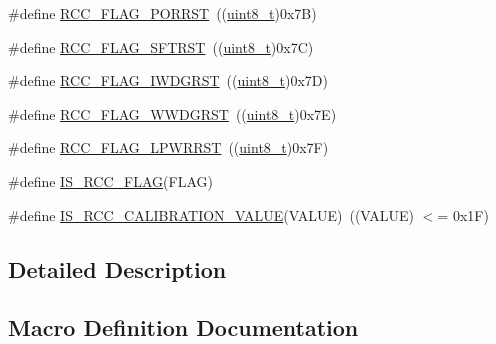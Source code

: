 \begin{DoxyCompactItemize}
\item 
\#define \hyperlink{group___r_c_c___flag_ga39ad309070f416720207eece5da7dc2c}{R\+C\+C\+\_\+\+F\+L\+A\+G\+\_\+\+P\+O\+R\+R\+ST}~((\hyperlink{_p_e___types_8h_aba7bc1797add20fe3efdf37ced1182c5}{uint8\+\_\+t})0x7\+B)
\item 
\#define \hyperlink{group___r_c_c___flag_gaf7852615e9b19f0b2dbc8d08c7594b52}{R\+C\+C\+\_\+\+F\+L\+A\+G\+\_\+\+S\+F\+T\+R\+ST}~((\hyperlink{_p_e___types_8h_aba7bc1797add20fe3efdf37ced1182c5}{uint8\+\_\+t})0x7\+C)
\item 
\#define \hyperlink{group___r_c_c___flag_gaac46bac8a97cf16635ff7ffc1e6c657f}{R\+C\+C\+\_\+\+F\+L\+A\+G\+\_\+\+I\+W\+D\+G\+R\+ST}~((\hyperlink{_p_e___types_8h_aba7bc1797add20fe3efdf37ced1182c5}{uint8\+\_\+t})0x7\+D)
\item 
\#define \hyperlink{group___r_c_c___flag_gaa80b60b2d497ccd7b7de1075009999a7}{R\+C\+C\+\_\+\+F\+L\+A\+G\+\_\+\+W\+W\+D\+G\+R\+ST}~((\hyperlink{_p_e___types_8h_aba7bc1797add20fe3efdf37ced1182c5}{uint8\+\_\+t})0x7\+E)
\item 
\#define \hyperlink{group___r_c_c___flag_ga67049531354aed7546971163d02c9920}{R\+C\+C\+\_\+\+F\+L\+A\+G\+\_\+\+L\+P\+W\+R\+R\+ST}~((\hyperlink{_p_e___types_8h_aba7bc1797add20fe3efdf37ced1182c5}{uint8\+\_\+t})0x7\+F)
\item 
\#define \hyperlink{group___r_c_c___flag_gaa27dea5bb62b26d0881e649770252158}{I\+S\+\_\+\+R\+C\+C\+\_\+\+F\+L\+AG}(F\+L\+AG)
\item 
\#define \hyperlink{group___r_c_c___flag_gafda50a08dc048f7c272bf04ec9c2c2b7}{I\+S\+\_\+\+R\+C\+C\+\_\+\+C\+A\+L\+I\+B\+R\+A\+T\+I\+O\+N\+\_\+\+V\+A\+L\+UE}(V\+A\+L\+UE)~((V\+A\+L\+UE) $<$= 0x1\+F)
\end{DoxyCompactItemize}


\subsection{Detailed Description}


\subsection{Macro Definition Documentation}
